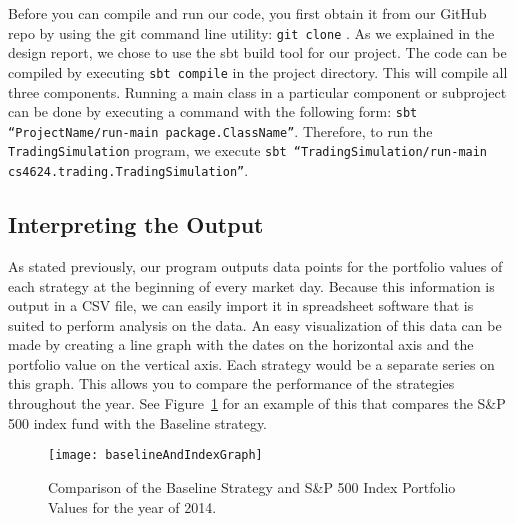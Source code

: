 Before you can compile and run our code, you first obtain it from our GitHub repo by using the git command line utility: \texttt{git clone}  \cite{github}.
As we explained in the design report, we chose to use the sbt build tool for our project.
The code can be compiled by executing \texttt{sbt compile} in the project directory.
This will compile all three components.
Running a main class in a particular component or subproject can be done by executing a command with the following form: \texttt{sbt ``ProjectName/run-main package.ClassName''}.
Therefore, to run the \texttt{TradingSimulation} program, we execute \texttt{sbt ``TradingSimulation/run-main cs4624.trading.TradingSimulation''}.

\subsection{Interpreting the Output}

As stated previously, our program outputs data points for the portfolio values of each strategy at the beginning of every market day.
Because this information is output in a CSV file, we can easily import it in spreadsheet software that is suited to perform analysis on the data.
An easy visualization of this data can be made by creating a line graph with the dates on the horizontal axis and the portfolio value on the vertical axis.
Each strategy would be a separate series on this graph.
This allows you to compare the performance of the strategies throughout the year.
See Figure~\ref{baselineAndIndexGraph} for an example of this that compares the S\&P 500 index fund with the Baseline strategy.

\begin{figure}[h]
  \label{baselineAndIndexGraph}
  \begin{center}
    \texttt{[image: baselineAndIndexGraph]}
  \end{center}
  \caption{Comparison of the Baseline Strategy and S\&P 500 Index Portfolio Values for the year of 2014.}
\end{figure}

